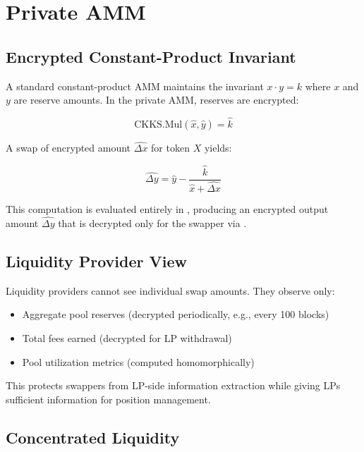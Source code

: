 \section{Private AMM}

\label{sec:amm}

\subsection{Encrypted Constant-Product Invariant}

A standard constant-product AMM maintains the invariant $x \cdot y = k$ where $x$ and $y$ are reserve amounts. In the private AMM, reserves are encrypted:

\begin{equation}
\text{CKKS.Mul}(\hat{x}, \hat{y}) = \hat{k}
\end{equation}

A swap of encrypted amount $\hat{\Delta x}$ for token $X$ yields:

\begin{equation}
\hat{\Delta y} = \hat{y} - \frac{\hat{k}}{\hat{x} + \hat{\Delta x}}
\end{equation}

This computation is evaluated entirely in \CKKS{}, producing an encrypted output amount $\hat{\Delta y}$ that is decrypted only for the swapper via \TChain{}.

\subsection{Liquidity Provider View}

Liquidity providers cannot see individual swap amounts. They observe only:

\begin{itemize}
    \item Aggregate pool reserves (decrypted periodically, e.g., every 100 blocks)
    \item Total fees earned (decrypted for LP withdrawal)
    \item Pool utilization metrics (computed homomorphically)
\end{itemize}

This protects swappers from LP-side information extraction while giving LPs sufficient information for position management.

\subsection{Concentrated Liquidity}

